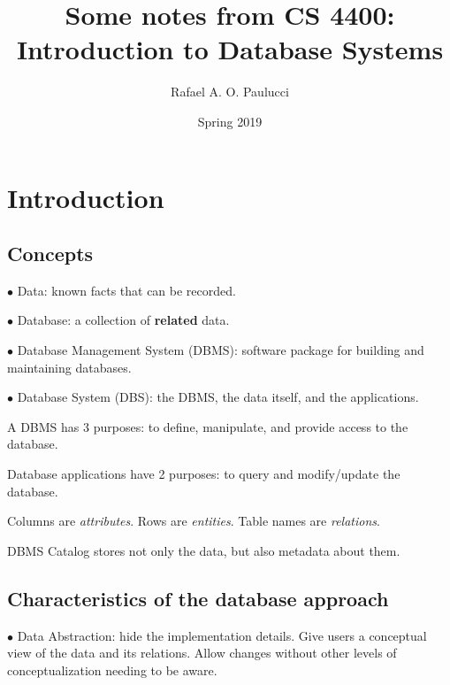 \documentclass[english,openany]{book}
\begin{document}
    \title{Some notes from CS 4400: Introduction to Database Systems}
    \author{Rafael A. O. Paulucci}
    \date{Spring 2019}

    \maketitle

    \tableofcontents


    \chapter{Introduction}

    \section{Concepts}

    $\bullet$ Data: known facts that can be recorded.

    $\bullet$ Database: a collection of \textbf{related} data.

    $\bullet$ Database Management System (DBMS): software package for building and maintaining databases.

    $\bullet$ Database System (DBS): the DBMS, the data itself, and the applications.

    A DBMS has 3 purposes: to define, manipulate, and provide access to the database.

    Database applications have 2 purposes: to query and modify/update the database.

    Columns are \textit{attributes}. Rows are \textit{entities}. Table names are \textit{relations}.

    DBMS Catalog stores not only the data, but also metadata about them.

    \section{Characteristics of the database approach}

    $\bullet$ Data Abstraction: hide the implementation details. Give users a conceptual view of the data and its relations. Allow changes without other levels of conceptualization needing to be aware.
\end{document}

